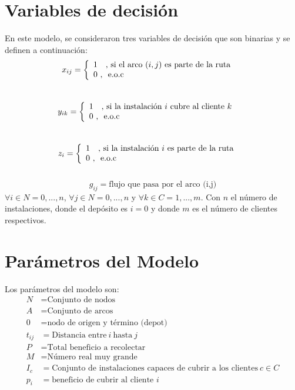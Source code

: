 \documentclass[11pt,addpoints]{article}
\begin{document}
\section{Variables de decisión}
En este modelo, se consideraron tres variables de decisión que son binarias y se definen a continuación:\\
\begin{equation*} 
	x_{ij} =\left\lbrace 
    \begin{array}{ll} 1\ \textup{ \ ,\ }  \text{si el arco}\ (i,j) \ \text{es parte de la ruta} & \\ 0 \textup{\ , \ } \text{e.o.c} \end{array} \right.
    \end{equation*}\\
    \begin{equation*} 
	y_{ik} =\left\lbrace 
    \begin{array}{ll} 1\ \textup{ \ ,\ }  \text{si la instalación}\ i \ \text{cubre al cliente } k \ & \\ 0 \textup{\ , \ } \text{e.o.c} \end{array} \right.
    \end{equation*}\\
    \begin{equation*} 
	z_{i} =\left\lbrace 
    \begin{array}{ll} 1\ \textup{ \ ,\ }  \text{si la instalación}\ i \ \text{es parte de la ruta} & \\ 0 \textup{\ , \ } \text{e.o.c} \end{array} \right.\end{equation*}\\
    \begin{equation*}
    g_{ij} = \text{flujo que pasa por el arco (i,j)}    
    \end{equation*}
$\forall i \in N=0,...,n$, $\forall j \in N=0,...,n$ y $\forall k \in C=1,...,m$. Con $n$ el número de instalaciones, donde el depósito es $i=0$ y donde $m$ es el número de clientes respectivos. 
\section{Parámetros del Modelo}
Los parámetros del modelo son:
\begin{align*}
    N &= \text{Conjunto de nodos}\\
    A &= \text{Conjunto de arcos}\\
    0 &= \text{nodo de origen y término (depot)}\\
    t_{ij} &= \text{Distancia entre}\ i \ \text{hasta}\ j\\
    P &= \text{Total beneficio a recolectar}\\
    M &= \text{Número real muy grande}\\
I_c &= \text{Conjunto de instalaciones capaces de cubrir a los clientes}\ c \in C\\
    p_i &= \text{beneficio de cubrir al cliente }i
\end{align*}
\newpage %
\vspace*{0.3cm} %
\end{document}
